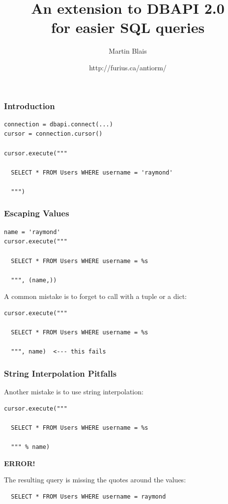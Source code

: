 \documentclass{beamer}
\title{An extension to DBAPI 2.0 \\
for easier SQL queries}
\subtitle{}
\author{Martin Blais}
\institute{Furius Enterprises}
\date{http://furius.ca/antiorm/}
\newcommand{\bigerror}{\begin{center}{\textbf{ERROR!}}\end{center}}
\begin{document}
\begin{frame}
  \titlepage
\end{frame}



\begin{frame}[fragile]
  \frametitle{Introduction}

\begin{verbatim}
connection = dbapi.connect(...)
cursor = connection.cursor()

cursor.execute("""

  SELECT * FROM Users WHERE username = 'raymond'

  """)
\end{verbatim}

\end{frame}


\begin{frame}[fragile]
  \frametitle{Escaping Values}

\begin{verbatim}
name = 'raymond'
cursor.execute("""

  SELECT * FROM Users WHERE username = %s

  """, (name,))
\end{verbatim}

\vfill\pause

A common mistake is to forget to call with a tuple or a dict:
\begin{verbatim}
cursor.execute("""

  SELECT * FROM Users WHERE username = %s

  """, name)  <--- this fails
\end{verbatim}

\end{frame}


\begin{frame}[fragile]
  \frametitle{String Interpolation Pitfalls}

Another mistake is to use string interpolation:
\begin{verbatim}
cursor.execute("""

  SELECT * FROM Users WHERE username = %s

  """ % name)
\end{verbatim}

\bigerror

The resulting query is missing the quotes around the values:
\begin{verbatim}
  SELECT * FROM Users WHERE username = raymond
\end{verbatim}

\end{frame}
\end{document}
